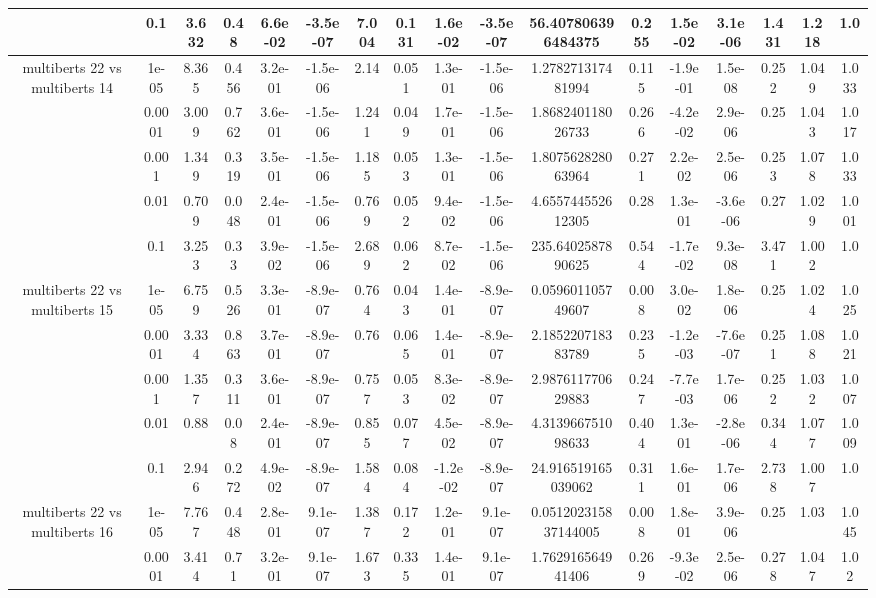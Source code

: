 \begin{tabular}{|c|c|c|c|c|c|c|c|c|c|c|c|c|c|c|c|c|}
 & 0.1 & 3.632 & 0.48 & 6.6e-02 & -3.5e-07 & 7.004 & 0.131 & 1.6e-02 & -3.5e-07 & 56.407806396484375 & 0.255 & 1.5e-02 & 3.1e-06 & 1.431 & 1.218 & 1.0 \\
\hline
\multirow{5}{*}{multiberts 22 vs multiberts 14} & 1e-05 & 8.365 & 0.456 & 3.2e-01 & -1.5e-06 & 2.14 & 0.051 & 1.3e-01 & -1.5e-06 & 1.278271317481994 & 0.115 & -1.9e-01 & 1.5e-08 & 0.252 & 1.049 & 1.033 \\
 & 0.0001 & 3.009 & 0.762 & 3.6e-01 & -1.5e-06 & 1.241 & 0.049 & 1.7e-01 & -1.5e-06 & 1.868240118026733 & 0.266 & -4.2e-02 & 2.9e-06 & 0.25 & 1.043 & 1.017 \\
 & 0.001 & 1.349 & 0.319 & 3.5e-01 & -1.5e-06 & 1.185 & 0.053 & 1.3e-01 & -1.5e-06 & 1.807562828063964 & 0.271 & 2.2e-02 & 2.5e-06 & 0.253 & 1.078 & 1.033 \\
 & 0.01 & 0.709 & 0.048 & 2.4e-01 & -1.5e-06 & 0.769 & 0.052 & 9.4e-02 & -1.5e-06 & 4.655744552612305 & 0.28 & 1.3e-01 & -3.6e-06 & 0.27 & 1.029 & 1.001 \\
 & 0.1 & 3.253 & 0.33 & 3.9e-02 & -1.5e-06 & 2.689 & 0.062 & 8.7e-02 & -1.5e-06 & 235.6402587890625 & 0.544 & -1.7e-02 & 9.3e-08 & 3.471 & 1.002 & 1.0 \\
\hline
\multirow{5}{*}{multiberts 22 vs multiberts 15} & 1e-05 & 6.759 & 0.526 & 3.3e-01 & -8.9e-07 & 0.764 & 0.043 & 1.4e-01 & -8.9e-07 & 0.059601105749607 & 0.008 & 3.0e-02 & 1.8e-06 & 0.25 & 1.024 & 1.025 \\
 & 0.0001 & 3.334 & 0.863 & 3.7e-01 & -8.9e-07 & 0.76 & 0.065 & 1.4e-01 & -8.9e-07 & 2.185220718383789 & 0.235 & -1.2e-03 & -7.6e-07 & 0.251 & 1.088 & 1.021 \\
 & 0.001 & 1.357 & 0.311 & 3.6e-01 & -8.9e-07 & 0.757 & 0.053 & 8.3e-02 & -8.9e-07 & 2.987611770629883 & 0.247 & -7.7e-03 & 1.7e-06 & 0.252 & 1.032 & 1.007 \\
 & 0.01 & 0.88 & 0.08 & 2.4e-01 & -8.9e-07 & 0.855 & 0.077 & 4.5e-02 & -8.9e-07 & 4.313966751098633 & 0.404 & 1.3e-01 & -2.8e-06 & 0.344 & 1.077 & 1.009 \\
 & 0.1 & 2.946 & 0.272 & 4.9e-02 & -8.9e-07 & 1.584 & 0.084 & -1.2e-02 & -8.9e-07 & 24.916519165039062 & 0.311 & 1.6e-01 & 1.7e-06 & 2.738 & 1.007 & 1.0 \\
\hline
\multirow{5}{*}{multiberts 22 vs multiberts 16} & 1e-05 & 7.767 & 0.448 & 2.8e-01 & 9.1e-07 & 1.387 & 0.172 & 1.2e-01 & 9.1e-07 & 0.051202315837144005 & 0.008 & 1.8e-01 & 3.9e-06 & 0.25 & 1.03 & 1.045 \\
 & 0.0001 & 3.414 & 0.71 & 3.2e-01 & 9.1e-07 & 1.673 & 0.335 & 1.4e-01 & 9.1e-07 & 1.762916564941406 & 0.269 & -9.3e-02 & 2.5e-06 & 0.278 & 1.047 & 1.02 \\

\end{tabular}
